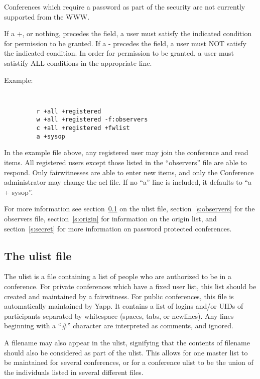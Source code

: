 \documentclass[twoside]{report}
\begin{document}
         Conferences which require a password as part of the security are
         not currently supported from the WWW.
       
         If a +, or nothing, precedes the field, a user must satisfy the
         indicated condition for permission to be granted.  If a - precedes 
         the field, a user must NOT satisfy the indicated condition.
         In order for permission to be granted, a user must satistify ALL
         conditions in the appropriate line.  
      
      Example:
      {\tt
         \begin{verbatim}
         r +all +registered
         w +all +registered -f:observers
         c +all +registered +fwlist
         a +sysop
         \end{verbatim}
      }
      
         In the example file above, any registered user may join the conference
         and read items.  All registered users except those listed in the 
         ``observers'' file are able to respond.  Only fairwitnesses are able
         to enter new items, and only the Conference administrator may change
         the acl file.  If no ``a'' line is included, it defaults to 
         ``a + sysop''.
     
         For more information see section~\ref{s:ulist} on the ulist file, 
         section~\ref{s:observers} for the observers file, 
         section~\ref{s:origin} for information on the origin list,
         and section~\ref{s:secret} for more information on 
         password protected conferences.

      \subsection{The ulist file} \label{s:ulist}
         The ulist is a file containing a list of people 
         who are authorized to be in a conference.  For private conferences 
         which have a fixed user list, this list should be created and 
         maintained by a fairwitness.  For public conferences, this 
         file is automatically maintained by Yapp.  It contains a list of 
         logins and/or UIDs of participants separated by whitespace 
         (spaces, tabs, or newlines).  Any lines beginning with a 
         ``\#'' character are interpreted as comments, and ignored. 
 
         A filename may also appear in the ulist, signifying that the
         contents of filename should also be considered as part of the
         ulist.  This allows for one master list to be maintained for
         several conferences, or for a conference ulist to be the union
         of the individuals listed in several different files.
\end{document}
